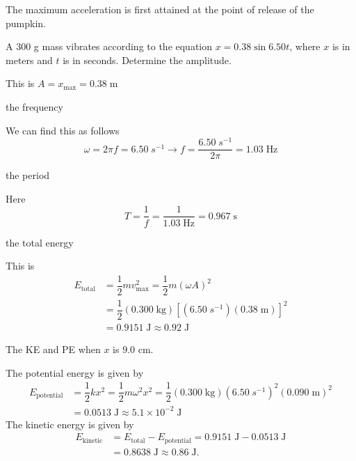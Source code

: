 \documentclass{ximera}
\begin{document}
\begin{interactive}[interactiveContent.js]
\begin{question}
\begin{solution}
The maximum acceleration is first attained at the point of release of the pumpkin.
\end{solution}
\end{question}
\begin{question}
A $300$ g mass vibrates according to the equation $x=0.38\sin 6.50 t$, where $x$ is in meters and $t$ is in seconds. Determine the amplitude.
\begin{solution}
This is $A=x_{\text{max}}=\boxed{0.38\;\text{m}}$
\end{solution}
the frequency
\begin{solution}
We can find this as follows
$$
\omega = 2\pi f=6.50\;s^{-1}\rightarrow f=\dfrac{6.50\;s^{-1}}{2\pi}=\boxed{1.03\;\text{Hz}}
$$
\end{solution}
the period
\begin{solution}
Here
$$
T=\dfrac{1}{f}=\dfrac{1}{1.03\;\text{Hz}}=\boxed{0.967\;\text{s}}
$$
\end{solution}
the total energy
\begin{solution}
This is
\begin{align*}
E_{\text{total}}&=\dfrac{1}{2}mv^2_{\text{max}}=\dfrac{1}{2}m(\omega A)^2\\
&=\dfrac{1}{2}(0.300\;\text{kg})\left[(6.50\;s^{-1})(0.38\;\text{m})\right]^2\\
&=0.9151\;\text{J}\approx\boxed{0.92\;\text{J}}
\end{align*}
\end{solution}
The KE and PE when $x$ is $9.0$ cm.
\begin{solution}
The potential energy is given by
\begin{align*}
E_{\text{potential}}&=\dfrac{1}{2}kx^2=\dfrac{1}{2}m\omega^2 x^2=\dfrac{1}{2}(0.300\;\text{kg})(6.50\;s^{-1})^2(0.090\;\text{m})^2\\
&=0.0513\;\text{J}\approx \boxed{5.1\times 10^{-2}\;\text{J}}
\end{align*}
The kinetic energy is given by
\begin{align*}
E_{\text{kinetic}}&=E_{\text{total}}-E_{\text{potential}}=0.9151\;\text{J}-0.0513\;\text{J}\\
&=0.8638\;\text{J}\approx \boxed{0.86\;\text{J}}.
\end{align*}
\end{solution}

\end{question}
\end{interactive}
\end{document}
